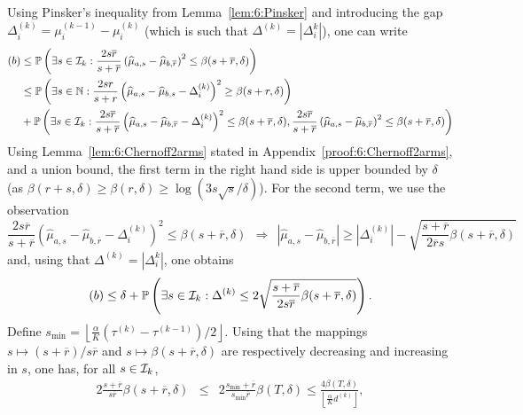 Using Pinsker's inequality from Lemma~\ref{lem:6:Pinsker} and introducing the gap $\Delta_i^{(k)} = \mu_i^{(k-1)} - {\mu}_i^{(k)}$ (which is such that $\Delta^{(k)} = |\Delta_i^k|$), one can write
%
\begin{align}
    (b) & \leq \mathbb{P}\left(\exists s \in \mathcal{I}_k : \frac{2s\overline{r}}{s+\overline{r}}\left(\widehat{\mu}_{a,s} - \widehat{\mu}_{b,\overline{r}} \right)^2  \leq \beta(s+\overline{r},\delta)\right)\nonumber\\
    & \leq \mathbb{P}\left(\exists s \in \mathbb{N} : \frac{2sr}{s+r}\left(\widehat{\mu}_{a,s} - \widehat{\mu}_{b,s} - \Delta_i^{(k)}\right)^2  \geq \beta(s+r,\delta)\right) \nonumber\\
    & + \mathbb{P}\left(\exists s \in \mathcal{I}_k : \frac{2s\overline{r}}{s+\overline{r}}\left(\widehat{\mu}_{a,s} - \widehat{\mu}_{b,\overline{r}} - \Delta_i^{(k)}\right)^2  \leq \beta(s+\overline{r},\delta), \frac{2s\overline{r}}{s+\overline{r}}\left(\widehat{\mu}_{a,s} - \widehat{\mu}_{b,\overline{r}}\right)^2  \leq \beta(s+\overline{r},\delta)\right) \nonumber
\end{align}
%
Using Lemma~\ref{lem:6:Chernoff2arms} stated in Appendix~\ref{proof:6:Chernoff2arms}, and a union bound, the first term in the right hand side is upper bounded by $\delta$ (as $\beta(r+s,\delta) \geq \beta(r,\delta) \geq \log(3s\sqrt{s}/\delta)$). For the second term, we use the observation
\[\frac{2s\overline{r}}{s+\overline{r}}\left(\widehat{\mu}_{a,s} - \widehat{\mu}_{b,\overline{r}} - \Delta_i^{(k)}\right)^2  \leq \beta(s+\overline{r},\delta) \ \ \Rightarrow \ \ |\widehat{\mu}_{a,s} - \widehat{\mu}_{b,\overline{r}}| \geq |\Delta_i^{(k)}| - \sqrt{\frac{s+\overline{r}}{2\overline{r}s}\beta(s+\overline{r},\delta)}\]
and, using that $\Delta^{(k)} = |\Delta_i^k|$, one obtains
%
\begin{equation}\label{eq:6:FromHereGlobal}
    (b) \leq \delta + \mathbb{P}\left(\exists s \in \mathcal{I}_k : \Delta^{(k)} \leq 2\sqrt{\frac{s+\overline{r}}{2s\overline{r}}\beta(s+\overline{r},\delta)}\right).
\end{equation}
%
Define $s_{\min} = \left\lfloor \frac{\alpha}{K} (\tau^{(k)}-\tau^{(k-1)})/2\right\rfloor$. Using that the mappings $s \mapsto (s+\overline{r})/s\overline{r}$ and $s \mapsto \beta(s + \overline{r},\delta)$ are respectively decreasing and increasing in $s$, one has, for all $s\in \mathcal{I}_k$,
\begin{eqnarray*}
    2\frac{s+\overline{r}}{s\overline{r}}\beta\left(s+\overline{r}, \delta\right) & \leq &
    2\frac{s_{\min}+\overline{r}}{s_{\min}\overline{r}}\beta\left(T, \delta\right) \leq \frac{4\beta(T,\delta)}{\left\lfloor \frac{\alpha}{K}d^{(k)}\right\rfloor},
\end{eqnarray*}
